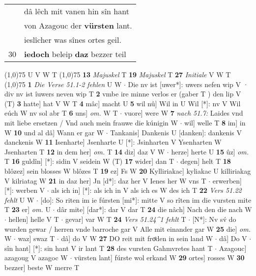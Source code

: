 \documentclass[8pt,a4paper,notitlepage]{article}
\begin{document}
\begin{table}[ht]
\begin{minipage}[t]{0.5\linewidth}
\begin{tabular}{rl}
 & dâ lêch mit vanen hin sîn hant\\ 
 & von Azagouc der \textbf{vürsten} lant.\\ 
 & ieslîcher was sînes ortes geil.\\ 
30 & \textbf{iedoch} beleip \textbf{daz} bezzer teil\\ 
\end{tabular}
\scriptsize
\line(1,0){75} \newline
U V W T \newline
\line(1,0){75} \newline
\textbf{13} \textit{Majuskel} T  \textbf{19} \textit{Majuskel} T  \textbf{27} \textit{Initiale} V W T  \newline
\line(1,0){75} \newline
\textbf{1} \textit{Die Verse 51.1-2 fehlen} U W   $\cdot$ Die nv ist [uwer*]: uwers nefen wip V · div nv ist îuwers neven wip T \textbf{2} vmbe ire minne verlos er (gaber T ) den lip V (T) \textbf{3} hatte] hat V W T \textbf{4} mâc] macht U \textbf{5} wil nû] Wil in U Wil [*]: nv V Wil eúch W nv sol abr T \textbf{6} uns] \textit{om.} W T  $\cdot$ vuore] were W \textbf{7} \textit{nach 51.7:} Laides vnd mit liebe ersetzen / Vnd auch mein frauwe die kúnigin W   $\cdot$ wil] welle T \textbf{8} im] in W \textbf{10} und al dâ] Wann er gar W  $\cdot$ Tankanis] Dankenis U [danken]: dankenis V danckenis W \textbf{11} Isenharte] Jsenharte U [*]: Jsinharten V Ysenharten W Jsenharten T \textbf{12} in dem her] \textit{om.} T \textbf{14} diz] daz V W  $\cdot$ herze] herte U \textbf{15} ûz] \textit{om.} T \textbf{16} guldîn] [*]: sidin V seidein W (T) \textbf{17} wider] dan T  $\cdot$ degen] helt T \textbf{18} blôzez] sein blosses W blôzes T \textbf{19} ez] Fs W \textbf{20} Kylliriakac] kyliakac U killiriakag V kilriatag W \textbf{21} in daz her] Jn [d*]: daz her V Ienes her W vns T  $\cdot$ erwerben] [*]: werben V  $\cdot$ als ich in] [*]: als ich in V als ich es W des ich T \textbf{22} \textit{Vers 51.22 fehlt} U W   $\cdot$ [do]: So riten im ie fúrsten [mi*]: mitte V so rîten im die vursten mite T \textbf{23} er] \textit{om.} U  $\cdot$ dâr mite] [dar*]: dar V dar T \textbf{24} die nâch] Nach den die nach W  $\cdot$ hellen] helle V T  $\cdot$ gevar] var W T \textbf{24} \textit{Vers 51.24\textasciicircum1 fehlt} T   $\cdot$ [N*]: Nv sv́ do wurden gewar / herren vnde barroche gar V Alle mit einander gar W \textbf{25} die] \textit{om.} W  $\cdot$ waz] swaz T  $\cdot$ dâ] do V W \textbf{27} DO reit mit froͤden in sein land W  $\cdot$ dâ] Do V  $\cdot$ sîn hant] [*]: sin hant V ir lant T \textbf{28} des vursten Gahmvretes hant T  $\cdot$ Azagouc] azagoug V azagoc W  $\cdot$ vürsten lant] fúrste wol erkand W \textbf{29} ortes] rosses W \textbf{30} bezzer] beste W merre T \newline
\end{minipage}
\end{table}
\end{document}
